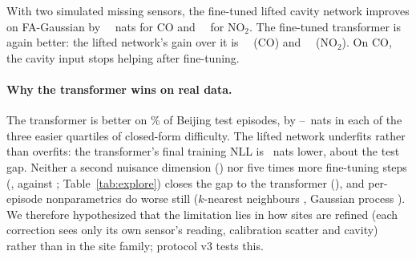 With two simulated missing sensors, the fine-tuned lifted cavity network improves on FA-Gaussian by
\RairqcoeTwovsfa\ \RairqcoeTwovsfaci\ nats for CO and \RairqnoTwoeTwovsfa\ \RairqnoTwoeTwovsfaci\ for NO$_2$. The
fine-tuned transformer is again better: the lifted network's gain over it is \RairqcoeTwovspfn\ \RairqcoeTwovspfnci\
(CO) and \RairqnoTwoeTwovspfn\ \RairqnoTwoeTwovspfnci\ (NO$_2$). On CO, the cavity input stops helping after
fine-tuning.

\paragraph{Why the transformer wins on real data.}
The transformer is better on \FTbeijingpfnbetterpct\% of Beijing test episodes, by
\FTbeijinggapqQOne--\FTbeijinggapqQTwo\ nats in each of the three easier quartiles of closed-form difficulty. The
lifted network underfits rather than overfits: the transformer's final training NLL is \FTbeijingtraingap\ nats
lower, about the test gap. Neither a second nuisance dimension (\Xplifttwo) nor five times more fine-tuning steps
(\Xpliftlong, against \Xpliftone; Table~\ref{tab:explore}) closes the gap to the transformer
(\RbeijingeZerovalftpfn), and per-episode nonparametrics do worse still ($k$-nearest neighbours \RbeijingeZerovalknn,
Gaussian process \RbeijingeZerovalgp). We therefore hypothesized that the limitation lies in how sites are refined
(each correction sees only its own sensor's reading, calibration scatter and cavity) rather than in the site family;
protocol v3 tests this.
